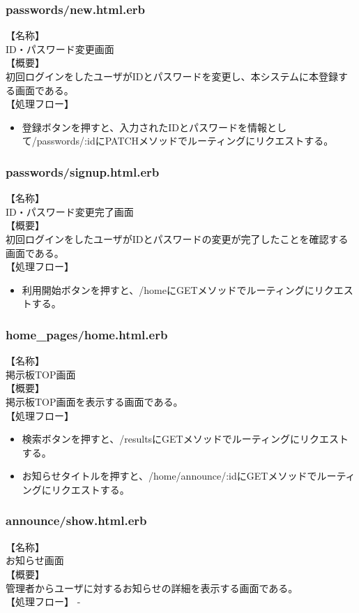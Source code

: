 \documentclass[a4j]{jarticle}
\begin{document}
\subsubsection{passwords/new.html.erb}
\noindent
【名称】\\
ID・パスワード変更画面\\
【概要】\\
初回ログインをしたユーザがIDとパスワードを変更し、本システムに本登録する画面である。\\
【処理フロー】
\begin{itemize}
  \item 登録ボタンを押すと、入力されたIDとパスワードを情報として/passwords/:idにPATCHメソッドでルーティングにリクエストする。
\end{itemize}

\subsubsection{passwords/signup.html.erb}
\noindent
【名称】\\
ID・パスワード変更完了画面\\
【概要】\\
初回ログインをしたユーザがIDとパスワードの変更が完了したことを確認する画面である。\\
【処理フロー】
\begin{itemize}
  \item 利用開始ボタンを押すと、/homeにGETメソッドでルーティングにリクエストする。
\end{itemize}


\subsubsection{home\_pages/home.html.erb}
\noindent
【名称】\\
掲示板TOP画面\\
【概要】\\
掲示板TOP画面を表示する画面である。\\
【処理フロー】
\begin{itemize}
  \item 検索ボタンを押すと、/resultsにGETメソッドでルーティングにリクエストする。
  \item お知らせタイトルを押すと、/home/announce/:idにGETメソッドでルーティングにリクエストする。
\end{itemize}

\subsubsection{announce/show.html.erb}
\noindent
【名称】\\
お知らせ画面\\
【概要】\\
管理者からユーザに対するお知らせの詳細を表示する画面である。\\
【処理フロー】
-
\end{document}
